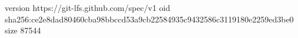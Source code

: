 version https://git-lfs.github.com/spec/v1
oid sha256:ce2e8dad80460cba98bbccd53a9cb22584935c9432586c3119180e2259ed3be0
size 87544
